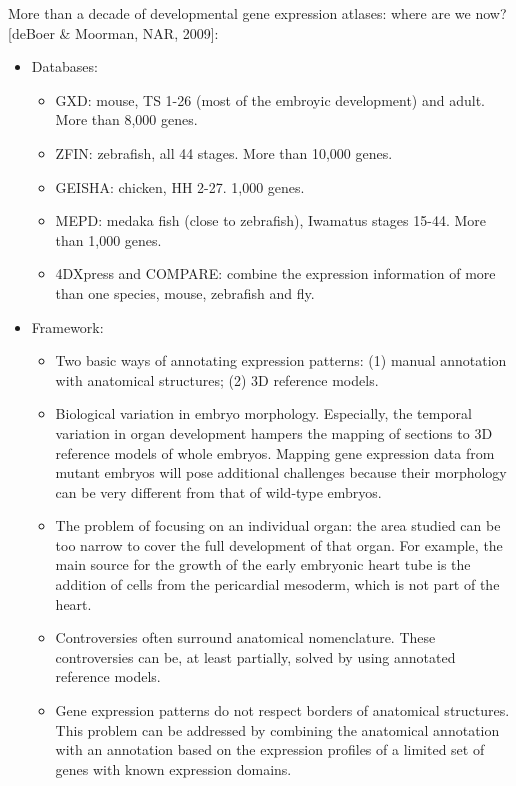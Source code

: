 \documentclass{report}
\begin{document}
\begin{enumerate}
	More than a decade of developmental gene expression atlases: where are we now? [deBoer \& Moorman, NAR, 2009]:
	\begin{itemize}
		\item Databases: 
		\begin{itemize}
			\item GXD: mouse, TS 1-26 (most of the embroyic development) and adult. More than 8,000 genes. 
			\item ZFIN: zebrafish, all 44 stages. More than 10,000 genes. 
			\item GEISHA: chicken, HH 2-27. 1,000 genes. 
			\item MEPD: medaka fish (close to zebrafish), Iwamatus stages 15-44. More than 1,000 genes. 
			\item 4DXpress and COMPARE: combine the expression information of more than one species, mouse, zebrafish and fly. 
		\end{itemize}
		
		\item Framework: 
		\begin{itemize}
			\item Two basic ways of annotating expression patterns: (1) manual annotation with anatomical structures; (2) 3D reference models. 
			\item Biological variation in embryo morphology. Especially, the temporal variation in organ development hampers the mapping of sections to 3D reference models of whole embryos. Mapping gene expression data from mutant embryos will pose additional challenges because their morphology can be very different from that of wild-type embryos.
			\item The problem of focusing on an individual organ: the area studied can be too narrow to cover the full development of that organ. For example,
			the main source for the growth of the early embryonic heart tube is the addition of cells from the pericardial mesoderm, which is not part of the heart. 
			\item Controversies often surround anatomical nomenclature. These controversies can be, at least partially, solved by using annotated reference models.
			\item Gene expression patterns do not respect borders of anatomical structures. This problem can be addressed by combining the anatomical annotation with an annotation based on the expression profiles of a limited set of genes with known expression domains.
		\end{itemize}
	\end{itemize}
	

\end{enumerate}
\end{document}
